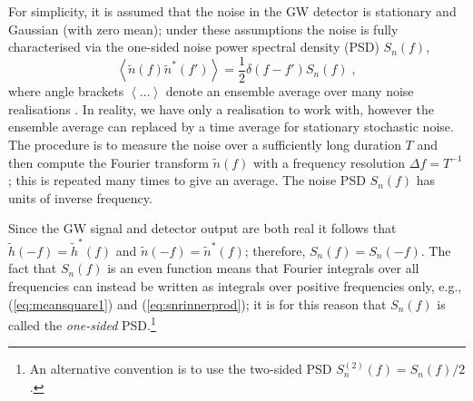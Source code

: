 For simplicity, it is assumed that the noise in the GW detector is stationary and Gaussian (with zero mean); under these assumptions the noise is fully characterised via the one-sided noise power spectral density (PSD) $S_{n}(f)$, 
\begin{equation}\label{eq:psd}
\left<\tilde{n}(f)\tilde{n}^{*}(f')\right>=\frac{1}{2}\delta (f-f')S_{n}(f) \; ,
\end{equation}
where angle brackets $\left<\ldots\right>$ denote an ensemble average over many noise realisations \citep{Cutler1994}. In reality, we have only a realisation to work with, however the ensemble average can replaced by a time average for stationary stochastic noise. The procedure is to measure the noise over a sufficiently long duration $T$ and then compute the Fourier transform $\tilde{n}(f)$ with a frequency resolution $\Delta f = T^{-1}$; this is repeated many times to give an average. The noise PSD $S_{n}(f)$ has units of inverse frequency.

Since the GW signal and detector output are both real it follows that $\tilde{h}(-f)=\tilde{h}^{*}(f)$ and $\tilde{n}(-f)=\tilde{n}^{*}(f)$; therefore, $S_{n}(f)=S_{n}(-f)$. The fact that $S_{n}(f)$ is an even function means that Fourier integrals over all frequencies can instead be written as integrals over positive frequencies only, e.g., (\ref{eq:meansquare1}) and (\ref{eq:snrinnerprod}); it is for this reason that $S_{n}(f)$ is called the \emph{one-sided} PSD.\footnote{An alternative convention is to use the two-sided PSD $S^{(2)}_{n}(f) = S_{n}(f)/2$.}

